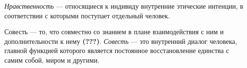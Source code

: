 \textit{Нравственность} --- относящиеся к индивиду внутренние этические интенции, в соответствии с которыми поступает отдельный человек.


Совесть --- то, что совместно со знанием в плане взаимодействия с ним и дополнительности к нему \textbf{(???)}. \textit{Совесть} --- это внутренний диалог человека, главной функцией которого является постоянное восстановление единства с самим собой, миром и другими.

